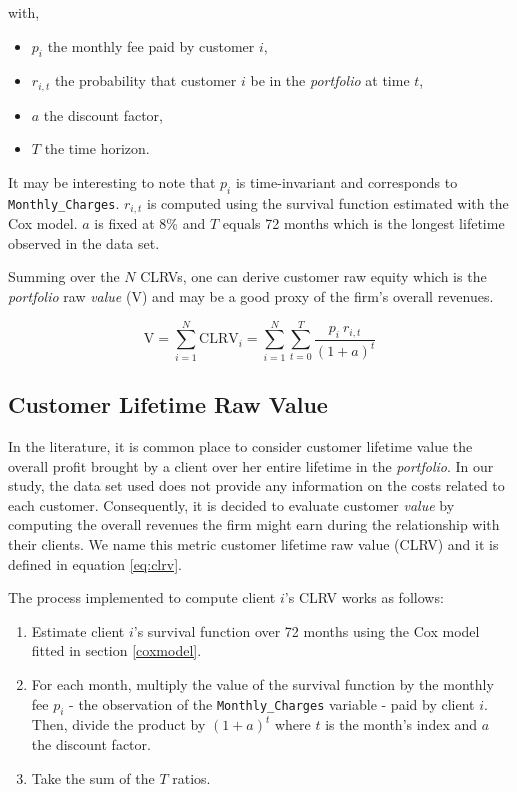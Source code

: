 \documentclass[
]{book}
\providecommand{\tightlist}{%
  \setlength{\itemsep}{0pt}\setlength{\parskip}{0pt}}
\begin{document}
with,

\begin{itemize}
\tightlist
\item
  \(p_i\) the monthly fee paid by customer \(i\),
\item
  \(r_{i,t}\) the probability that customer \(i\) be in the \emph{portfolio} at time \(t\),
\item
  \(a\) the discount factor,
\item
  \(T\) the time horizon.
\end{itemize}

It may be interesting to note that \(p_i\) is time-invariant and corresponds to \texttt{Monthly\_Charges}. \(r_{i,t}\) is computed using the survival function estimated with the Cox model. \(a\) is fixed at 8\% and \(T\) equals 72 months which is the longest lifetime observed in the data set.

Summing over the \(N\) CLRVs, one can derive customer raw equity which is the \emph{portfolio} raw \emph{value} (V) and may be a good proxy of the firm's overall revenues.

\begin{equation}
    \text{V} = \sum_{i=1}^{N} \text{CLRV}_i = \sum_{i=1}^{N} \sum_{t=0}^{T} \frac{p_i \ r_{i,t}}{(1+a)^t} 
    \label{eq:cre}
\end{equation}

\hypertarget{customer-lifetime-raw-value}{%
\subsection{Customer Lifetime Raw Value}\label{customer-lifetime-raw-value}}

In the literature, it is common place to consider customer lifetime value the overall profit brought by a client over her entire lifetime in the \emph{portfolio}. In our study, the data set used does not provide any information on the costs related to each customer. Consequently, it is decided to evaluate customer \emph{value} by computing the overall revenues the firm might earn during the relationship with their clients. We name this metric customer lifetime raw value (CLRV) and it is defined in equation \eqref{eq:clrv}.

The process implemented to compute client \(i\)'s CLRV works as follows:

\begin{enumerate}
\def\labelenumi{\arabic{enumi}.}
\tightlist
\item
  Estimate client \(i\)'s survival function over 72 months using the Cox model fitted in section \ref{coxmodel}.
\item
  For each month, multiply the value of the survival function by the monthly fee \(p_i\) - the observation of the \texttt{Monthly\_Charges} variable - paid by client \(i\). Then, divide the product by \((1 + a)^t\) where \(t\) is the month's index and \(a\) the discount factor.
\item
  Take the sum of the \(T\) ratios.
\end{enumerate}
\end{document}
